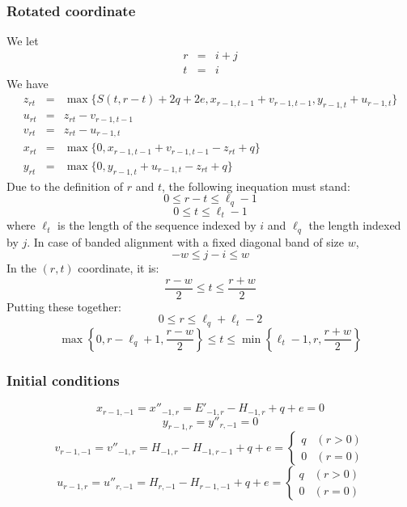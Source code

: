 \documentclass[10pt]{article}
\begin{document}
\subsubsection{Rotated coordinate}

We let
\begin{eqnarray*}
r&=&i+j\\
t&=&i
\end{eqnarray*}
We have
\begin{eqnarray*}
z_{rt}&=&\max\{S(t,r-t)+2q+2e,x_{r-1,t-1}+v_{r-1,t-1},y_{r-1,t}+u_{r-1,t}\}\\
u_{rt}&=&z_{rt}-v_{r-1,t-1}\\
v_{rt}&=&z_{rt}-u_{r-1,t}\\
x_{rt}&=&\max\{0,x_{r-1,t-1}+v_{r-1,t-1}-z_{rt}+q\}\\
y_{rt}&=&\max\{0,y_{r-1,t}+u_{r-1,t}-z_{rt}+q\}
\end{eqnarray*}
Due to the definition of $r$ and $t$, the following inequation must stand:
\[0\le r-t \le\ell_q-1\]
\[0\le t \le\ell_t-1\]
where $\ell_t$ is the length of the sequence indexed by $i$ and $\ell_q$ the
length indexed by $j$. In case of banded alignment with a fixed diagonal band
of size $w$,
\[-w\le j-i\le w\]
In the $(r,t)$ coordinate, it is:
\[\frac{r-w}{2}\le t\le \frac{r+w}{2}\]
Putting these together:
\[0\le r\le \ell_q+\ell_t-2\]
\[\max\left\{0,r-\ell_q+1,\frac{r-w}{2}\right\}\le t\le\min\left\{\ell_t-1,r,\frac{r+w}{2}\right\}\]

\subsubsection{Initial conditions}
\[x_{r-1,-1}=x''_{-1,r}=E'_{-1,r}-H_{-1,r}+q+e=0\]
\[y_{r-1,r}=y''_{r,-1}=0\]
\[v_{r-1,-1}=v''_{-1,r}=H_{-1,r}-H_{-1,r-1}+q+e=\left\{\begin{array}{ll}
  q & (r>0) \\
  0 & (r=0)
\end{array}\right.\]
\[u_{r-1,r}=u''_{r,-1}=H_{r,-1}-H_{r-1,-1}+q+e=\left\{\begin{array}{ll}
  q & (r>0) \\
  0 & (r=0)
\end{array}\right.\]
\end{document}

